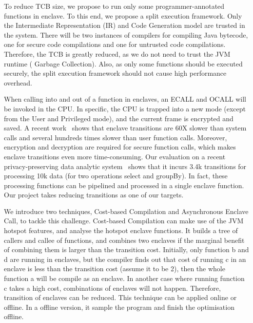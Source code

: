 To reduce TCB size, we propose to run only some programmer-annotated functions
in enclave. To this end, we propose a split execution framework.
Only the Intermediate Representation (IR)
and Code Generation model are trusted in the system. There will be two instances
of compilers for compiling Java bytecode, one for secure code compilations and 
one
for untrusted code compilations. Therefore, the TCB is greatly reduced, as we
do not need to trust the JVM runtime (\eg{} Garbage Collection). Also, as only
some functions should be executed securely, the split execution framework
should not cause high performance overhead.

When calling into and out of a function in enclaves, an ECALL and OCALL
will be invoked in the CPU. In specific, the CPU is trapped into a new mode 
(except from
the User and Privileged mode), and the current frame is encrypted and saved.
A recent work~\cite{sgxkernel:cf17} shows that enclave transitions are 60X 
slower
than system calls and several hundreds times slower than user function calls.
Moreover, encryption and decryption are required for secure function calls,
which makes enclave transitions even more time-consuming.
Our evaluation on a recent privacy-preserving data analytic 
system~\cite{opaque:nsdi17} shows that
it incurs 3.4k transitions for processing 10k data (for two operations select 
and groupBy).
In fact, these processing functions can be pipelined and processed in a single
enclave function. Our project takes reducing transitions as one of our targets.

We introduce two techniques, Cost-based Compilation and Asynchronous
Enclave Call, to tackle this challenge.
Cost-based Compilation can make use of the JVM hotspot features, and analyse
the hotspot enclave functions. It builds a tree of callers and callee of 
functions,
and combines two enclaves if the marginal benefit of combining them is larger 
than
the transition cost. Initially, only function b and d
are running in enclaves, but the compiler finds out that cost of running c in an 
enclave is less than the transition cost (assume it to be 2), then the whole 
function a will be compile as an enclave. In another case where running 
function c takes a high cost, combinations of enclaves will not happen.
Therefore, transition of enclaves can be reduced. This technique can be applied
online or offline. In a offline version, it sample the program and finish the
optimisation offline.

